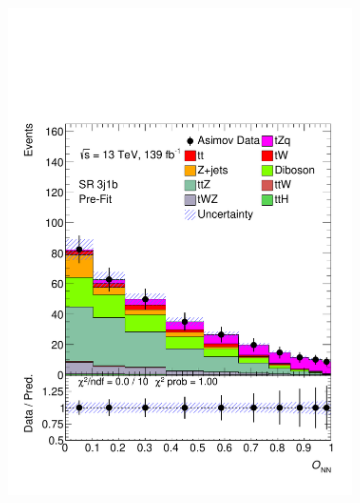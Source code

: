 \begin{figure}[!h]
\begin{subfigure}[b]{0.33\linewidth}
    \includegraphics[width=\textwidth]{ubonn-thesis/Chapters/Chapters_07/Figure/Asmiov/SR_3j1b.pdf} 
  \end{subfigure} 
  \begin{subfigure}[b]{0.33\linewidth}
    \centering

\end{subfigure}
\end{figure}
